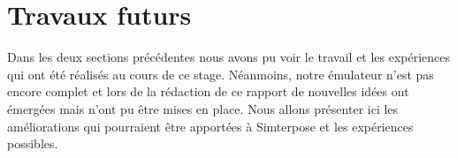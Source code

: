 \section{Travaux futurs}
\label{section:future_work}

Dans les deux sections précédentes nous avons pu voir le travail et les expériences qui ont été réalisés au cours de ce stage. Néanmoins, notre émulateur n'est pas encore complet et lors de la rédaction de ce rapport de nouvelles idées ont émergées mais n'ont pu être mises en place. Nous allons présenter ici les améliorations qui pourraient être apportées à Simterpose et les expériences possibles.

